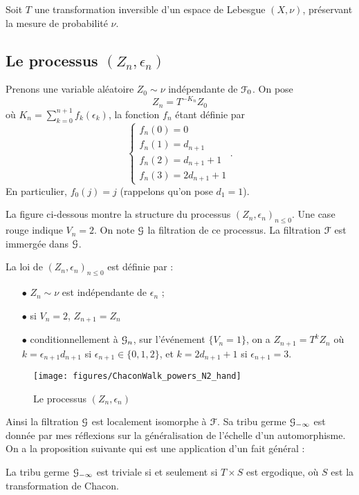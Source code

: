 \documentclass[12pt,a4paper]{article}
\begin{document}
Soit $T$ une transformation inversible d'un espace de Lebesgue $(X,\nu)$, 
préservant la mesure de probabilité $\nu$. 

\subsection{Le processus $(Z_n,\epsilon_n)$}

Prenons une variable aléatoire $Z_0 \sim \nu$ indépendante de $\EuScript{F}_0$. 
On pose 
$$
Z_n = T^{-K_n}Z_0
$$
où $K_n=\sum_{k=0}^{n+1}f_k(\epsilon_k)$, la fonction $f_n$ étant définie par 
$$
\begin{cases}
f_n(0) = 0 \\ 
f_n(1) = d_{n+1} \\ 
f_n(2) = d_{n+1}+1 \\
f_n(3) = 2 d_{n+1} + 1
\end{cases}.
$$
En particulier, $f_0(j)=j$ (rappelons qu'on pose $d_1=1$). 

La figure ci-dessous montre la structure du processus ${(Z_n, \epsilon_n)}_{n \leq 0}$. 
Une case rouge indique $V_n=2$. 
On note $\EuScript{G}$ la filtration de ce processus. La filtration $\EuScript{F}$ est immergée dans $\EuScript{G}$. 

La loi de ${(Z_n, \epsilon_n)}_{n \leq 0}$ est définie par : 
\begin{itemize}
\item[$\bullet$] $Z_n \sim \nu$ est indépendante de $\epsilon_n$ ;

\item[$\bullet$] si $V_n=2$, $Z_{n+1} = Z_n$ 

\item[$\bullet$] conditionnellement à $\EuScript{G}_n$, sur l'événement $\{V_n=1\}$, 
on a $Z_{n+1} = T^k Z_n$ où $k=\epsilon_{n+1} d_{n+1}$ si $\epsilon_{n+1} \in \{0, 1, 2\}$, 
et $k = 2 d_{n+1} + 1$ si $\epsilon_{n+1}=3$. 
\end{itemize}

\begin{figure}[!h]
\centering
	\texttt{[image: figures/ChaconWalk\_powers\_N2\_hand]}
\caption{Le processus $(Z_n, \epsilon_n)$}\label{fig:Zn}
\end{figure}

Ainsi la filtration $\EuScript{G}$ est localement isomorphe à $\EuScript{F}$. 
Sa tribu germe $\EuScript{G}_{-\infty}$ est donnée par mes réflexions 
sur la généralisation de l'échelle d'un automorphisme. 
On a la proposition suivante qui est une application d'un fait général : 

\begin{ppsition}
La tribu germe $\EuScript{G}_{-\infty}$ est triviale si et seulement si $T\times S$ est ergodique, 
où $S$ est la transformation de Chacon. 
\end{ppsition}
\end{document}
